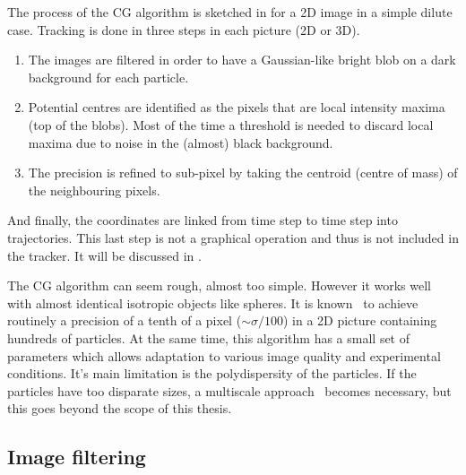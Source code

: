 The process of the \ac{CG} algorithm is sketched in  for a 2D image in a simple dilute case. Tracking is done in three steps in each picture (2D or 3D).
\begin{enumerate}
	\item The images are filtered in order to have a Gaussian-like bright blob on a dark background for each particle. 
	\item Potential centres are identified as the pixels that are local intensity maxima (top of the blobs). Most of the time a threshold is needed to discard local maxima due to noise in the (almost) black background.
	\item The precision is refined to sub-pixel by taking the centroid (centre of mass) of the neighbouring pixels.
\end{enumerate}

And finally, the coordinates are linked from time step to time step into trajectories. This last step is not a graphical operation and thus is not included in the tracker. It will be discussed in .

The \ac{CG} algorithm can seem rough, almost too simple. However it works well with almost identical isotropic objects like spheres. It is known~\citep{crocker1996mdv} to achieve routinely a precision of a tenth of a pixel ($\sim\sigma/100$) in a 2D picture containing hundreds of particles. At the same time, this algorithm has a small set of parameters which allows adaptation to various image quality and experimental conditions. It's main limitation is the polydispersity of the particles. If the particles have too disparate sizes, a multiscale approach~\citep{Adelson1984, Lindeberg1993, OlivoMarin2002, Hinz2005} becomes necessary, but this goes beyond the scope of this thesis. 



\subsection{Image filtering}

